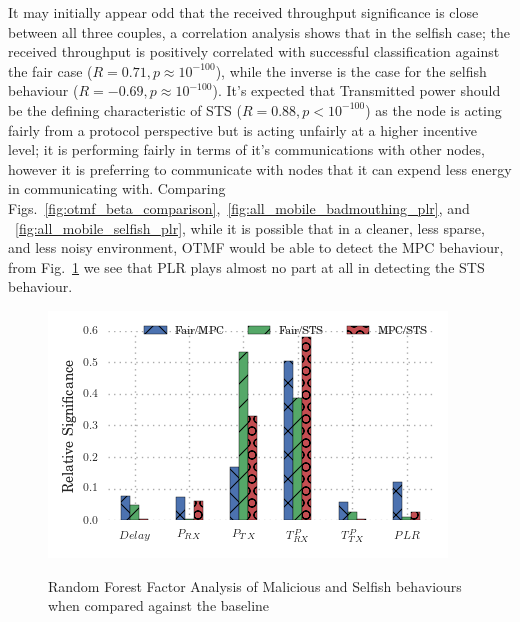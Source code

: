 \documentclass[conference]{IEEEtran}
\begin{document}
It may initially appear odd that the received throughput significance is close between all three couples, a correlation analysis shows that in the selfish case; the received throughput is positively correlated with successful classification against the fair case ($R=0.71, p\approx10^{-100}$), while the inverse is the case for the selfish behaviour ($R=-0.69, p\approx10^{-100}$).
It's expected that Transmitted power should be the defining characteristic of STS ($R=0.88, p<10^{-100}$) as the node is acting fairly from a protocol perspective but is acting unfairly at a higher incentive level; it is performing fairly in terms of it's communications with other nodes, however it is preferring to communicate with nodes that it can expend less energy in communicating with.
Comparing Figs.~\ref{fig:otmf_beta_comparison},~\ref{fig:all_mobile_badmouthing_plr}, and ~\ref{fig:all_mobile_selfish_plr}, while it is possible that in a cleaner, less sparse, and less noisy environment, OTMF would be able to detect the MPC behaviour, from Fig.~\ref{fig:malselfactors} we see that PLR plays almost no part at all in detecting the STS behaviour.

\begin{figure}
  \centering
  \includegraphics[width=0.95\linewidth]{img/MaliciousSelfishMetricFactors}\label{fig:malselfactors}
  \caption{Random Forest Factor Analysis of Malicious and Selfish behaviours when compared against the baseline}
\end{figure}
\end{document}
